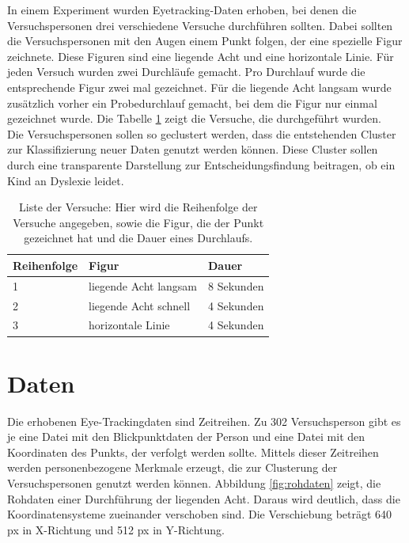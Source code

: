 \documentclass[12pt]{article}
\begin{document}
In einem Experiment wurden Eyetracking-Daten erhoben, bei denen die Versuchspersonen drei verschiedene Versuche durchf\"uhren sollten. Dabei sollten die Versuchspersonen mit den Augen einem Punkt folgen, der eine spezielle Figur zeichnete. Diese Figuren sind eine liegende Acht und eine horizontale Linie. F\"ur jeden Versuch wurden zwei Durchl\"aufe gemacht. Pro Durchlauf wurde die entsprechende Figur zwei mal gezeichnet. F\"ur die liegende Acht langsam wurde zus\"atzlich vorher ein Probedurchlauf gemacht, bei dem die Figur nur einmal gezeichnet wurde.
Die Tabelle \ref{tab:Versuche} zeigt die Versuche, die durchgef\"uhrt wurden.\\
Die Versuchspersonen sollen so geclustert werden, dass die entstehenden Cluster zur Klassiﬁzierung neuer Daten genutzt werden k\"onnen. Diese Cluster sollen durch eine transparente Darstellung zur Entscheidungsfindung beitragen, ob ein Kind an Dyslexie leidet.

\begin{table}[h]
	\caption{\label{tab:Versuche}Liste der Versuche: Hier wird die Reihenfolge der Versuche angegeben, sowie die Figur, die der Punkt ge\-zeich\-net hat und die Dauer eines Durchlaufs.}
	\noindent \centering{}
	\bgroup
	\def\arraystretch{2}  %
	\begin{tabular}{|l|l|l|}
		\hline
		\textbf{Reihenfolge} & \textbf{Figur} & \textbf{Dauer}\\
		\hline \hline
		1 & liegende Acht langsam & 8 Sekunden\\
		\hline
		2 & liegende Acht schnell & 4 Sekunden\\
		\hline
		3 & horizontale Linie & 4 Sekunden\\
		\hline
	\end{tabular}
	\egroup
\end{table}

\section*{Daten}
Die erhobenen Eye-Trackingdaten sind Zeitreihen. Zu 302 Versuchsperson gibt es je eine Datei mit den Blickpunktdaten der Person und eine Datei mit den Koordinaten des Punkts, der verfolgt werden sollte.
Mittels dieser Zeitreihen werden personenbezogene Merkmale erzeugt, die zur Clusterung der Versuchspersonen genutzt werden k\"onnen.
Abbildung \ref{fig:rohdaten} zeigt, die Rohdaten einer Durchführung der liegenden Acht. Daraus wird deutlich, dass die Koordinatensysteme zueinander verschoben sind. Die Verschiebung betr\"agt 640 px in X-Richtung und 512 px in Y-Richtung.
\end{document}
